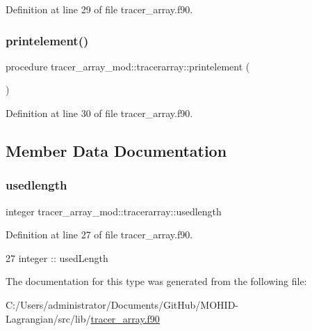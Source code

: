 Definition at line 29 of file tracer\+\_\+array.\+f90.

\mbox{\label{structtracer__array__mod_1_1tracerarray_a253185a06f76355710fcdd52d9a525f6}} 
\subsubsection{\texorpdfstring{printelement()}{printelement()}}
{\footnotesize\ttfamily procedure tracer\+\_\+array\+\_\+mod\+::tracerarray\+::printelement (\begin{DoxyParamCaption}{ }\end{DoxyParamCaption})\hspace{0.3cm}{\ttfamily [private]}}



Definition at line 30 of file tracer\+\_\+array.\+f90.



\subsection{Member Data Documentation}
\mbox{\label{structtracer__array__mod_1_1tracerarray_aa2315d68128c5a0695d2233a48680328}} 
\subsubsection{\texorpdfstring{usedlength}{usedlength}}
{\footnotesize\ttfamily integer tracer\+\_\+array\+\_\+mod\+::tracerarray\+::usedlength\hspace{0.3cm}{\ttfamily [private]}}



Definition at line 27 of file tracer\+\_\+array.\+f90.


\begin{DoxyCode}
27         \textcolor{keywordtype}{integer} :: usedLength
\end{DoxyCode}


The documentation for this type was generated from the following file\+:\begin{DoxyCompactItemize}
\item 
C\+:/\+Users/administrator/\+Documents/\+Git\+Hub/\+M\+O\+H\+I\+D-\/\+Lagrangian/src/lib/\mbox{\hyperlink{tracer__array_8f90}{tracer\+\_\+array.\+f90}}\end{DoxyCompactItemize}
